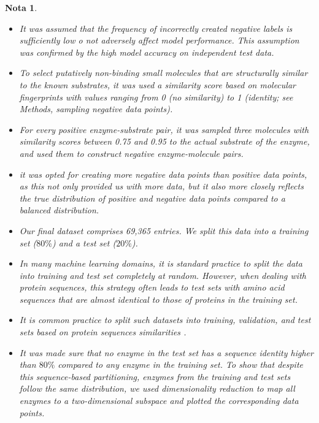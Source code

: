 \documentclass[12pt]{article}
\newtheorem{Note}{Nota}%
\begin{document}
\begin{Note}
\begin{itemize}
\item It was assumed that the frequency of incorrectly created negative labels is sufficiently low o not adversely affect model performance. This assumption was confirmed by the high model accuracy on independent test data.

\item To select putatively non-binding small molecules that are structurally similar to the known substrates, it was used a similarity score based on molecular fingerprints with values ranging from 0 (no similarity) to 1 (identity; see Methods, sampling negative data points). 

\item For every positive enzyme-substrate pair, it was sampled three molecules with similarity scores between 0.75 and 0.95 to the actual substrate of the enzyme, and used them to construct negative enzyme-molecule pairs. 

\item it was opted for creating more negative data points than positive data points, as this not only provided us with more data, but it also more closely reflects the true distribution of positive and negative data points compared to a balanced distribution.

\item Our final dataset comprises 69,365 entries. We split this data into a training set ($80\%$) and a test set ($20\%$). 

\item In many machine learning domains, it is standard practice to split the data into training and test set completely at random. However, when dealing with protein sequences, this strategy often leads to test sets with amino acid sequences that are almost identical to those of proteins in the training set. 

\item It is common practice to split such datasets into training, validation, and test sets based on protein sequences similarities \cite{2.44}.

\item It was made sure that no enzyme in the test set has a sequence identity higher than $80\%$ compared to any enzyme in the training set.  To show that despite this sequence-based partitioning, enzymes from the training and test sets follow the same distribution, we used dimensionality reduction to map all enzymes to a two-dimensional subspace and plotted the corresponding data points. 


\end{itemize}
\end{Note}
\end{document}
